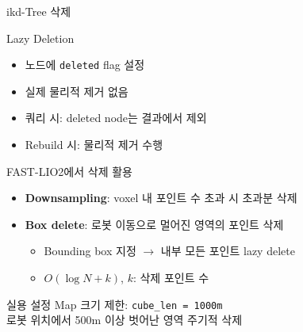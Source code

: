 \begin{frame}{ikd-Tree 삭제}
  \begin{block}{Lazy Deletion}
    \begin{itemize}
      \item 노드에 \texttt{deleted} flag 설정
      \item 실제 물리적 제거 없음
      \item 쿼리 시: deleted node는 결과에서 제외
      \item Rebuild 시: 물리적 제거 수행
    \end{itemize}
  \end{block}
  \pause
  \begin{block}{FAST-LIO2에서 삭제 활용}
    \begin{itemize}
      \item \textbf{Downsampling}: voxel 내 포인트 수 초과 시 초과분 삭제
      \item \textbf{Box delete}: 로봇 이동으로 멀어진 영역의 포인트 삭제
        \begin{itemize}
          \item Bounding box 지정 $\to$ 내부 모든 포인트 lazy delete
          \item $O(\log N + k)$, $k$: 삭제 포인트 수
        \end{itemize}
    \end{itemize}
  \end{block}
  \pause
  \begin{exampleblock}{실용 설정}
    Map 크기 제한: \texttt{cube\_len = 1000m}\\
    로봇 위치에서 500m 이상 벗어난 영역 주기적 삭제
  \end{exampleblock}
\end{frame}

